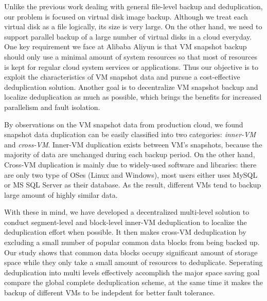 Unlike the previous work dealing with general file-level backup and deduplication, our problem is focused on 
virtual disk image backup. Although we treat each virtual disk  as a file logically, its size is very large.
On the other hand, we need to support parallel backup of a large number of virtual disks in a cloud everyday. 
One key requirement we face at Alibaba Aliyun is that VM snapshot backup should only use a minimal amount of system
resources so that most of resources is kept for regular cloud system services or applications.
Thus our objective is to exploit the characteristics of VM snapshot data and
pursue a cost-effective deduplication solution. 
Another goal  is to decentralize VM snapshot backup and  localize  deduplication as much as possible,
which brings the benefits for increased parallelism  and fault isolation.

By observations on the VM snapshot data from production cloud, we found snapshot data duplication 
can be easily classified into two categories: \emph{inner-VM} and \emph{cross-VM}. Inner-VM duplication
exists between VM's snapshots, because the majority of data are unchanged during each backup period. 
On the other hand, Cross-VM duplication is mainly due to widely-used software and libraries: 
there are only two type of OSes (Linux and Windows), most users either uses MySQL or MS SQL Server as their database.
As the result, different VMs tend to backup large amount of highly similar data.

With these in mind, we  have developed a decentralized multi-level solution to conduct 
segment-level  and block-level inner-VM  deduplication to localize the deduplication effort when possible.
It then makes cross-VM deduplication by excluding a small number of
popular common data blocks from being backed up. Our study shows that common data blocks
occupy significant amount of storage space while they only take
a small amount of resources to deduplicate.
Seperating deduplication into multi levels effectively accomplish the major space saving goal
compare the global complete deduplication scheme, at the same time it makes
the backup of different VMs to be indepdent for better fault tolerance.


